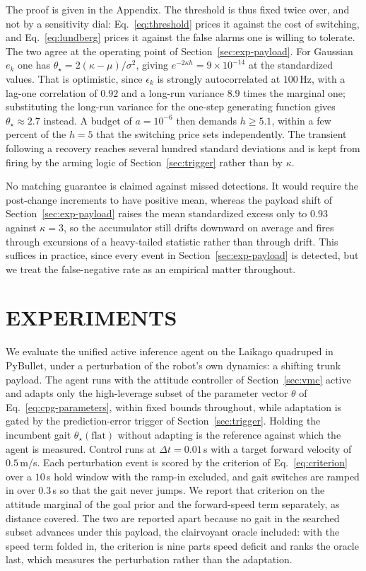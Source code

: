 \documentclass[letterpaper, 10 pt, conference]{ieeeconf}  %
\begin{document}
The proof is given in the Appendix.
The threshold is thus fixed twice over, and not by a sensitivity dial: Eq.~\ref{eq:threshold} prices it against the cost of switching, and Eq.~\ref{eq:lundberg} prices it against the false alarms one is willing to tolerate.
The two agree at the operating point of Section~\ref{sec:exp-payload}.
For Gaussian $e_k$ one has $\theta_{\star} = 2(\kappa - \mu)/\sigma^2$, giving $e^{-2\kappa h} = 9\times10^{-14}$ at the standardized values.
That is optimistic, since $\epsilon_k$ is strongly autocorrelated at $100$\,Hz, with a lag-one correlation of $0.92$ and a long-run variance $8.9$ times the marginal one; substituting the long-run variance for the one-step generating function gives $\theta_{\star} \approx 2.7$ instead.
A budget of $a = 10^{-6}$ then demands $h \geq 5.1$, within a few percent of the $h = 5$ that the switching price sets independently.
The transient following a recovery reaches several hundred standard deviations and is kept from firing by the arming logic of Section~\ref{sec:trigger} rather than by $\kappa$.

No matching guarantee is claimed against missed detections.
It would require the post-change increments to have positive mean, whereas the payload shift of Section~\ref{sec:exp-payload} raises the mean standardized excess only to $0.93$ against $\kappa=3$, so the accumulator still drifts downward on average and fires through excursions of a heavy-tailed statistic rather than through drift.
This suffices in practice, since every event in Section~\ref{sec:exp-payload} is detected, but we treat the false-negative rate as an empirical matter throughout.

\section{EXPERIMENTS}
\label{sec:experiments}

We evaluate the unified active inference agent on the Laikago quadruped in PyBullet, under a perturbation of the robot's own dynamics: a shifting trunk payload.
The agent runs with the attitude controller of Section~\ref{sec:vmc} active and adapts only the high-leverage subset of the parameter vector $\theta$ of Eq.~\ref{eq:cpg-parameters}, within fixed bounds throughout, while adaptation is gated by the prediction-error trigger of Section~\ref{sec:trigger}.
Holding the incumbent gait $\theta_{\star}(\text{flat})$ without adapting is the reference against which the agent is measured.
Control runs at $\Delta t = 0.01$\,s with a target forward velocity of $0.5$\,m/s.
Each perturbation event is scored by the criterion of Eq.~\ref{eq:criterion} over a $10$\,s hold window with the ramp-in excluded, and gait switches are ramped in over $0.3$\,s so that the gait never jumps.
We report that criterion on the attitude marginal of the goal prior and the forward-speed term separately, as distance covered.
The two are reported apart because no gait in the searched subset advances under this payload, the clairvoyant oracle included: with the speed term folded in, the criterion is nine parts speed deficit and ranks the oracle last, which measures the perturbation rather than the adaptation.
\end{document}
